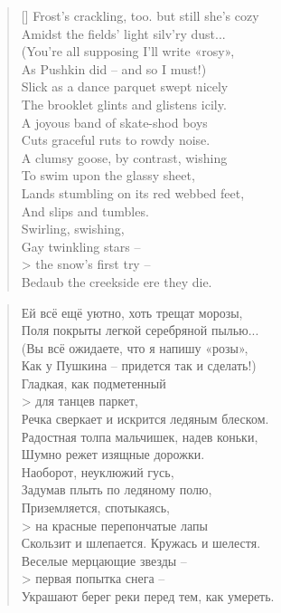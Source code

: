 \documentclass[../main.tex]{subfiles}
\begin{document}
\setlength\columnsep{1em}
\begin{paracol}{2}

\begingroup
\setlength{\vleftmargin}{0em}
\begin{verse}[\linewidth]
    Frost's crackling, too. but still she's cozy \\
    Amidst the fields' light silv'ry dust... \\
    (You're all supposing I'll write «rosy», \\
    As Pushkin did \--- and so I must!) \\
    Slick as a dance parquet swept nicely \\
    The brooklet glints and glistens icily. \\
    A joyous band of skate-shod boys \\
    Cuts graceful ruts to rowdy noise. \\
    A clumsy goose, by contrast, wishing \\
    To swim upon the glassy sheet, \\
    Lands stumbling on its red webbed feet, \\
    And slips and tumbles. \\
    Swirling, swishing, \\
    Gay twinkling stars \--- \\>
        the snow's first try \--- \\
    Bedaub the creekside ere they die.
\end{verse}
\endgroup

\switchcolumn

\begingroup
\setlength{\vleftmargin}{0em}
\begin{verse}
    Ей всё ещё уютно, хоть трещат морозы, \\
    Поля покрыты легкой серебряной пылью... \\
    (Вы всё ожидаете, что я напишу «розы», \\
    Как у Пушкина \--- придется так и сделать!) \\
    Гладкая, как подметенный \\>
        для танцев паркет, \\
    Речка сверкает и искрится ледяным блеском. \\
    Радостная толпа мальчишек, надев коньки, \\
    Шумно режет изящные дорожки. \\
    Наоборот, неуклюжий гусь, \\
    Задумав плыть по ледяному полю, \\
    Приземляется, спотыкаясь, \\>
        на красные перепончатые лапы \\
    Скользит и шлепается.
    Кружась и шелестя. \\
    Веселые мерцающие звезды \--- \\>
        первая попытка снега \--- \\
    Украшают берег реки перед тем, как умереть.
\end{verse}
\endgroup

\end{paracol}
\end{document}
